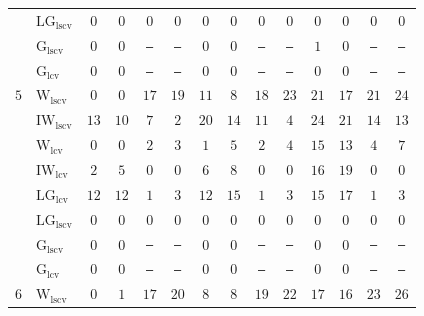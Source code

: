 \begin{table}[!htp]
\begin{tabular}{clcccccccccccc}
 & $\mathrm{LG}_{\mathrm{lscv}}$ & $0$ & $0$ & $0$ & $0$ & $0$ & $0$ & $0$ & $0$ & $0$ & $0$ & $0$ & $0$ \\
 & $\mathrm{G}_{\mathrm{lscv}}$ & $0$ & $0$ & \texttt{---} & \texttt{---} & $0$ & $0$ & \texttt{---} & \texttt{---} & $1$ & $0$ & \texttt{---} & \texttt{---} \\
 & $\mathrm{G}_{\mathrm{lcv}}$ & $0$ & $0$ & \texttt{---} & \texttt{---} & $0$ & $0$ & \texttt{---} & \texttt{---} & $0$ & $0$ & \texttt{---} & \texttt{---} \\
\midrule
$5$ & $\mathrm{W}_{\mathrm{lscv}}$ & $0$ & $0$ & \cellcolor{black!30}$17$ & \cellcolor{black!30}$19$ & $11$ & $8$ & \cellcolor{black!30}$18$ & \cellcolor{black!30}$23$ & \cellcolor{black!10}$21$ & $17$ & \cellcolor{black!30}$21$ & \cellcolor{black!30}$24$ \\
 & $\mathrm{IW}_{\mathrm{lscv}}$ & \cellcolor{black!30}$13$ & \cellcolor{black!10}$10$ & \cellcolor{black!10}$7$ & $2$ & \cellcolor{black!30}$20$ & \cellcolor{black!10}$14$ & \cellcolor{black!10}$11$ & \cellcolor{black!10}$4$ & \cellcolor{black!30}$24$ & \cellcolor{black!30}$21$ & \cellcolor{black!10}$14$ & \cellcolor{black!10}$13$ \\
 & $\mathrm{W}_{\mathrm{lcv}}$ & $0$ & $0$ & $2$ & \cellcolor{black!10}$3$ & $1$ & $5$ & $2$ & \cellcolor{black!10}$4$ & $15$ & $13$ & $4$ & $7$ \\
 & $\mathrm{IW}_{\mathrm{lcv}}$ & $2$ & $5$ & $0$ & $0$ & $6$ & $8$ & $0$ & $0$ & $16$ & \cellcolor{black!10}$19$ & $0$ & $0$ \\
 & $\mathrm{LG}_{\mathrm{lcv}}$ & \cellcolor{black!10}$12$ & \cellcolor{black!30}$12$ & $1$ & \cellcolor{black!10}$3$ & \cellcolor{black!10}$12$ & \cellcolor{black!30}$15$ & $1$ & $3$ & $15$ & $17$ & $1$ & $3$ \\
 & $\mathrm{LG}_{\mathrm{lscv}}$ & $0$ & $0$ & $0$ & $0$ & $0$ & $0$ & $0$ & $0$ & $0$ & $0$ & $0$ & $0$ \\
 & $\mathrm{G}_{\mathrm{lscv}}$ & $0$ & $0$ & \texttt{---} & \texttt{---} & $0$ & $0$ & \texttt{---} & \texttt{---} & $0$ & $0$ & \texttt{---} & \texttt{---} \\
 & $\mathrm{G}_{\mathrm{lcv}}$ & $0$ & $0$ & \texttt{---} & \texttt{---} & $0$ & $0$ & \texttt{---} & \texttt{---} & $0$ & $0$ & \texttt{---} & \texttt{---} \\
\midrule
$6$ & $\mathrm{W}_{\mathrm{lscv}}$ & $0$ & $1$ & \cellcolor{black!30}$17$ & \cellcolor{black!30}$20$ & $8$ & $8$ & \cellcolor{black!30}$19$ & \cellcolor{black!30}$22$ & \cellcolor{black!10}$17$ & $16$ & \cellcolor{black!30}$23$ & \cellcolor{black!30}$26$ \\

\end{tabular}
\end{table}
